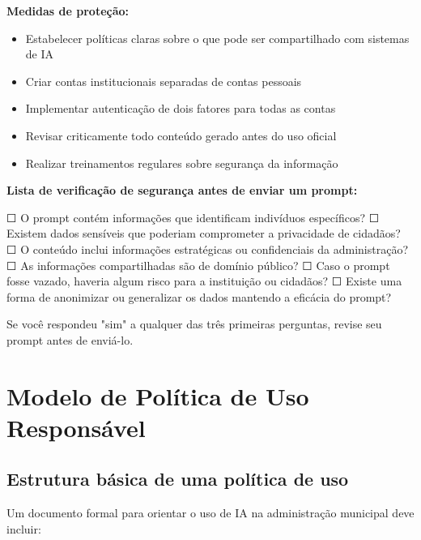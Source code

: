 \documentclass[12pt,a4paper]{book}
\begin{document}
\textbf{Medidas de proteção:}
\begin{itemize}
    \item Estabelecer políticas claras sobre o que pode ser compartilhado com sistemas de IA
    
    \item Criar contas institucionais separadas de contas pessoais
    
    \item Implementar autenticação de dois fatores para todas as contas
    
    \item Revisar criticamente todo conteúdo gerado antes do uso oficial
    
    \item Realizar treinamentos regulares sobre segurança da informação
\end{itemize}

\begin{tcolorbox}[exemplo]
\textbf{Lista de verificação de segurança antes de enviar um prompt:}

☐ O prompt contém informações que identificam indivíduos específicos?
☐ Existem dados sensíveis que poderiam comprometer a privacidade de cidadãos?
☐ O conteúdo inclui informações estratégicas ou confidenciais da administração?
☐ As informações compartilhadas são de domínio público?
☐ Caso o prompt fosse vazado, haveria algum risco para a instituição ou cidadãos?
☐ Existe uma forma de anonimizar ou generalizar os dados mantendo a eficácia do prompt?

Se você respondeu "sim" a qualquer das três primeiras perguntas, revise seu prompt antes de enviá-lo.
\end{tcolorbox}

\section{Modelo de Política de Uso Responsável}

\subsection{Estrutura básica de uma política de uso}

Um documento formal para orientar o uso de IA na administração municipal deve incluir:
\end{document}

